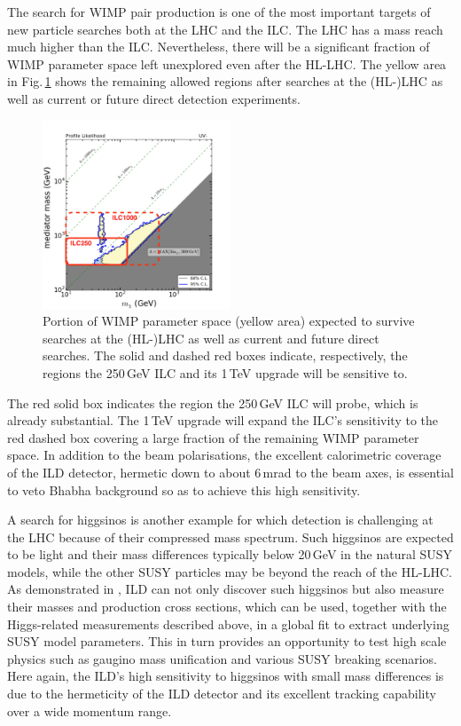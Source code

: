  The search for WIMP pair production is one of the most important targets of new particle searches both at the LHC and the ILC. The LHC has a mass reach much higher than the ILC. Nevertheless, there will be a significant fraction of WIMP parameter space left unexplored even after the HL-LHC. The yellow area in Fig.\,\ref{fig:WIMPleft} shows the remaining allowed regions after searches at the (HL-)LHC as well as current or future direct detection experiments\cite{Habermehl:2017dxh}.
\begin{figure}[htbp]
\begin{center}
 \includegraphics[width=0.5\textwidth]{Science/fig/UVminus_mx_lam_far_2ilc.pdf}
\end{center}
\caption{Portion of WIMP parameter space (yellow area) expected to survive searches at the (HL-)LHC as well as current and future direct searches. The solid and dashed red boxes indicate, respectively, the regions the 250\,GeV ILC and its 1\,TeV upgrade will be sensitive to\cite{Habermehl:2018yul}.
}
\label{fig:ilcWIMP}\label{fig:WIMPleft}
\end{figure}
The red solid box indicates the region the 250\,GeV ILC will probe, which is already substantial. The 1\,TeV upgrade will expand the ILC's sensitivity to the red dashed box covering a large fraction of the remaining WIMP parameter space\cite{Habermehl:2017dxh}. In addition to the beam polarisations, the excellent calorimetric coverage of the ILD detector, hermetic down to about 6\,mrad to the beam axes, is essential to veto Bhabha background so as to achieve this high sensitivity. 

A search for higgsinos is another example for which detection is challenging at the LHC because of their compressed mass spectrum. Such higgsinos are expected to be light and their mass differences typically below 20\,GeV in the natural SUSY models, while the other SUSY particles may be beyond the reach of the HL-LHC. As demonstrated in \cite{Baer:2016new}, ILD can not only discover such higgsinos but also measure their masses and production cross sections, which can be used, together with the Higgs-related measurements described above, in a global fit to extract underlying SUSY model parameters. This in turn provides an opportunity to test high scale physics such as gaugino mass unification and various SUSY breaking scenarios. Here again, the ILD's high sensitivity to higgsinos with small mass differences is due to the hermeticity of the ILD detector and its excellent tracking capability over a wide momentum range.


